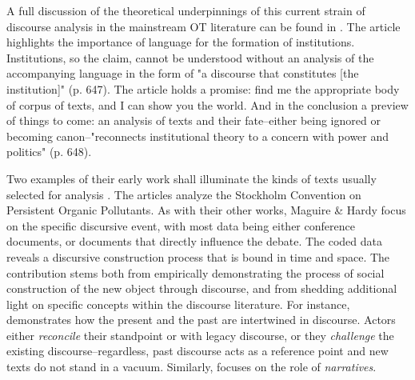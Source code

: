 A full discussion of the theoretical underpinnings of this current strain of discourse analysis in the mainstream OT literature can be found in \citet{Phillips2004}. The article highlights the importance of language for the formation of institutions. Institutions, so the claim, cannot be understood without an analysis of the accompanying language in the form of "a discourse that constitutes [the institution]" (p. 647). The article holds a promise: find me the appropriate body of corpus of texts, and I can show you the world. And in the conclusion a preview of things to come: an analysis of texts and their fate--either being ignored or becoming canon--"reconnects institutional theory to a concern with power and politics" (p. 648).


Two examples of their early work shall illuminate the kinds of texts usually selected for analysis \citep{Maguire2006,Hardy2010}. The articles analyze the Stockholm Convention on Persistent Organic Pollutants. As with their other works, Maguire \& Hardy focus on the specific discursive event, with most data being either conference documents, or documents that directly influence the debate. The coded data reveals a discursive construction process that is bound in time and space. The contribution stems both from empirically demonstrating the process of social construction of the new object through discourse, and from shedding additional light on specific concepts within the discourse literature. For instance, \citet{Maguire2006} demonstrates how the present and the past are intertwined in discourse. Actors either \textit{reconcile} their standpoint or with legacy discourse, or they \textit{challenge} the existing discourse--regardless, past discourse acts as a reference point and new texts do not stand in a vacuum. Similarly, \citet{Hardy2010} focuses on the role of \textit{narratives}.


